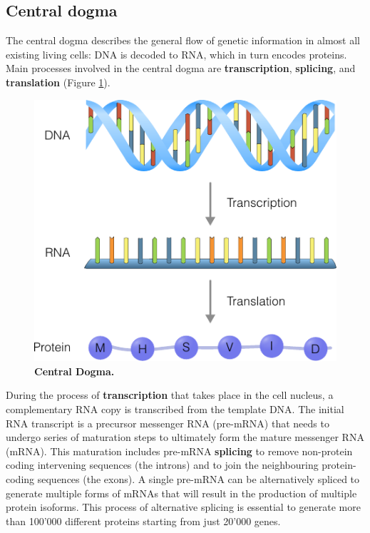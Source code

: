 \subsection{Central dogma}
The central dogma describes the general flow of genetic information in almost all existing living cells: DNA is decoded to RNA, which in turn encodes proteins\cite{strachan_humanmoleculargenetics_2011}. Main processes involved in the central dogma are \textbf{transcription}, \textbf{splicing}, and \textbf{translation} (Figure \ref{fig:centraldogma}). 

\begin{figure}[htb!]
	\centering
	\includegraphics[width=.7\linewidth]{fig/central_dogma} %
	\caption{
		\textbf{Central Dogma.}
	}
	\label{fig:centraldogma}
\end{figure}

During the process of \textbf{transcription} that takes place in the cell nucleus, a complementary RNA copy is transcribed from the template DNA. The initial RNA transcript is a precursor messenger RNA (pre-mRNA) that needs to undergo series of maturation steps to ultimately form the mature messenger RNA (mRNA). This maturation includes pre-mRNA \textbf{splicing} to remove non-protein coding intervening sequences (the introns) and to join the neighbouring protein-coding sequences (the exons). A single pre-mRNA can be alternatively spliced to generate multiple forms of mRNAs that will result in the production of multiple protein isoforms. This process of alternative splicing is essential to generate more than 100'000 different proteins starting from just 20'000 genes\cite{nilsen_expansioneukaryoticproteome_2010}.

